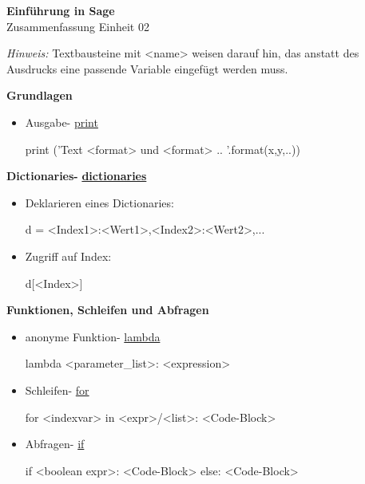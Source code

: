 \documentclass[a4paper,9pt,DIV15,twocolumn]{scrartcl}
\begin{document}
\begin{center}
    \textbf{\LARGE Einführung in Sage}\\
    {\large Zusammenfassung Einheit 02}
\end{center}
\textsl{Hinweis:} Textbausteine mit <name> weisen darauf hin, das anstatt des Ausdrucks eine passende Variable eingefügt werden muss.

\medskip
\textbf{Grundlagen}
\begin{itemize}
    \item Ausgabe- \href{http://docs.python.org/library/functions.html?highlight=print#print}{print} 
        \begin{sagein}
print ('Text {<format>} und {<format>} .. '.format(x,y,..))
        \end{sagein}
\end{itemize}



\textbf{Dictionaries- } \href{http://docs.python.org/library/stdtypes.html?highlight=.update#mapping-types-dict}{\textbf{dictionaries}}

\begin{itemize}
 \item Deklarieren eines Dictionaries:
\begin{sagein}
d = {<Index1>:<Wert1>,<Index2>:<Wert2>,...}
\end{sagein}
 \item Zugriff auf Index:
\begin{sagein}
d[<Index>]
\end{sagein}
\end{itemize}

\textbf{Funktionen, Schleifen und Abfragen}

\begin{itemize}
 \item anonyme Funktion- \href{http://docs.python.org/howto/functional.html#small-functions-and-the-lambda-expression}{lambda}
\begin{sagein}
lambda <parameter_list>: <expression> 
\end{sagein}
 \item Schleifen- \href{http://docs.python.org/tutorial/controlflow.html#for-statements}{for}
\begin{sagein}
for <indexvar> in <expr>/<list>:
    <Code-Block>
\end{sagein}
 \item Abfragen- \href{http://docs.python.org/reference/compound_stmts.html#the-if-statement}{if}
\begin{sagein}
if <boolean expr>:
    <Code-Block>
else:
    <Code-Block>
\end{sagein}

\end{itemize}
\end{document}
